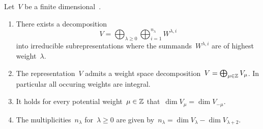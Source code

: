 \begin{theorem}
  \label{finite dimensional representations of sl2}
  Let~$V$ be a finite dimensional~{}.
  \begin{enumerate}
    \item
      There exists a decomposition
      \begin{equation}
        \label{decomposition into irreps}
        V
        =
        \bigoplus_{\lambda \geq 0}
        \bigoplus_{i=1}^{n_\lambda}
        W^{\lambda,i}
      \end{equation}
      into irreducible subrepresentations where the summands~$W^{\lambda,i}$ are of highest weight~$\lambda$.
    \item
      The representation~$V$ admits a weight space decomposition~$V = \bigoplus_{\mu \in \mathbb{Z}} V_\mu$.
      In particular all occuring weights are integral.
    \item
      It holds for every potential weight~$\mu \in \mathbb{Z}$ that~$\dim V_\mu = \dim V_{-\mu}$.
    \item
      \label{calculation of multiplicities}
      The multiplicities~$n_\lambda$ for~$\lambda \geq 0$ are given by~$n_\lambda = \dim V_\lambda - \dim V_{\lambda+2}$.
  \end{enumerate}
\end{theorem}


